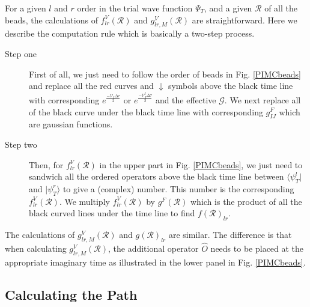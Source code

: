 \documentclass[12pt,letterpaper,UTF8]{report}
\begin{document}
For a given $l$ and $r$ order in the trial wave function $\Psi_T$, and a given $\mathcal{R}$ of all the beads, the calculations of $f^V_{lr}(\mathcal{R})$ and $g^V_{lr,M}(\mathcal{R})$ are straightforward. Here we describe the computation rule which is basically a two-step process.
\begin{description}
  \item[Step one] First of all, we just need to follow the order of beads in Fig. \ref{PIMCbeads} and replace all the red curves and $\downarrow$ symbols above the black time line with corresponding $e^{\frac{- \mathcal{V}_I \Delta \tau }{2}}$ or $e^{\frac{- \mathcal{V}^\dagger_I \Delta \tau }{2}}$ and the effective $\bm{\mathcal{G}}$.
       We next replace all of the black curve under the black time line with corresponding $g^F_{IJ}$ which are gaussian functions.
  \item[Step two] Then, for $f^V_{lr}(\mathcal{R})$ in the upper part in Fig. \ref{PIMCbeads}, we just need to sandwich all the ordered operators above the black time line between $\langle \psi_T^l |$ and $| \psi_T^r \rangle$ to give a (complex) number. This number is the corresponding $f^V_{lr}(\mathcal{R})$. We multiply $f^V_{lr}(\mathcal{R})$ by $g^F(\mathcal{R})$ which is the product of all the black curved lines under the time line to find $f(\mathcal{R})_{lr}$.
\end{description}

The calculations of $g^V_{lr,M}(\mathcal{R})$ and $g(\mathcal{R})_{lr}$ are similar. The difference is that when calculating $g^V_{lr,M}(\mathcal{R})$, the additional operator $\hat{O}$ needs to be placed at the appropriate imaginary time as illustrated in the lower panel in Fig. \ref{PIMCbeads}.


\subsection{Calculating the Path}
\label{secCalcPath}
\end{document}
